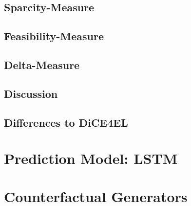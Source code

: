 \documentclass[12pt,a4paper]{report}
\begin{document}
\subsection{Sparcity-Measure}
\label{sec:sparcity}


\subsection{Feasibility-Measure}
\label{sec:feasibility}




\subsection{Delta-Measure}
\label{sec:delta}


\subsection{Discussion}


\subsection{Differences to DiCE4EL}

 


\section{Prediction Model: LSTM}
\label{sec:model_prediction}



% 

\section{Counterfactual Generators}
\label{sec:model_generation}
\end{document}
